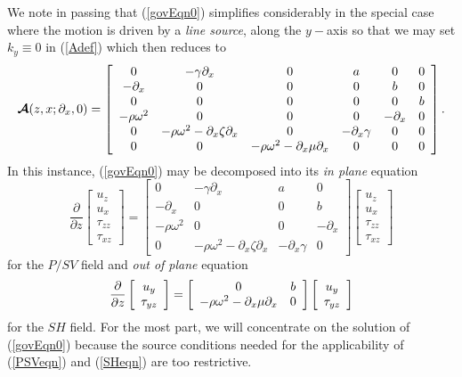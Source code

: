 \documentclass[11pt,a4paper]{article}
\newcommand{\CB}[1]{\mbox{\boldmath$\cal #1$\unboldmath}}
\begin{document}
We note in passing that (\ref{govEqn0}) simplifies considerably in the
special case where the motion is driven by a {\em line source\/}, along
the $y-$axis so that we may set  $k_y\equiv 0$ in (\ref{Adef}) which then
reduces to
\[
{\CB A}(z,x;{\partial }_{x},0)
=\left[{\begin{array}{cccccc}
0&- \gamma {\partial }_{  x}&  0&  a&0&0\\ -{ \partial
}_{x}&0&0&0&b&0\\ 0&0&0&0&0&b\\ - \rho {\omega }^{
2}&  0&0&0&-{ \partial }_{x}&0\\ 0&- \rho {\omega
}^{  2}  -{ \partial }_{x} \zeta {\partial }_{
x} &
0&  -{ \partial }_{x} \gamma &  0&0\\
0&0 &  - \rho {\omega }^{  2}
 -{ \partial }_{x} \mu
{\partial }_{  x}& 0 &  0&0\end{array}}\right].
\]
In this instance,  (\ref{govEqn0}) may be decomposed into its {\em in plane\/}
equation
\begin{equation} 	\label{PSVeqn}
{\frac{ \partial }{\partial z}}\left[{\begin{array}{c}{u}_{z}\\
{u}_{x}\\
{\tau }_{zz}\\
{\tau }_{xz}\end{array}}\right]
=\left[{\begin{array}{cccc}
0&- \gamma {\partial }_{  x}&  a&0\\
-{ \partial }_{x}&0&0&b\\
- \rho {\omega }^{  2}&  0&0&-{ \partial }_{x}\\
0&- \rho {\omega }^{  2}  -{ \partial }_{x} \zeta {\partial }_{  x} &
 -{ \partial }_{x} \gamma &  0
\end{array}}\right]
\left[{\begin{array}{c}{u}_{z}\\
{u}_{x}\\
{\tau }_{zz}\\
{\tau }_{xz}\end{array}}\right]
\end{equation}
for the $P/SV$ field and {\em out of plane\/} equation
\begin{equation} 	\label{SHeqn}
	{\frac{\partial }{\partial z}}\left[{\begin{array}{c}{u}_{y}\\
	{\rm \tau }_{yz}\end{array}}\right]
	=\left[{\begin{array}{cc}
	0&b\\
	- \rho {\omega }^{  2}-{ \partial }_{x} \mu {\partial }_{  x}& 0
	\end{array}}\right]
	\left[{\begin{array}{c}{u}_{y}\\
	{\rm \tau }_{yz}\end{array}}\right]
\end{equation}
for the $SH$ field.
For the most part, we will concentrate on the solution of (\ref{govEqn0})
because the source conditions needed for the applicability of (\ref{PSVeqn}) and (\ref{SHeqn})
are too restrictive.
\end{document}
